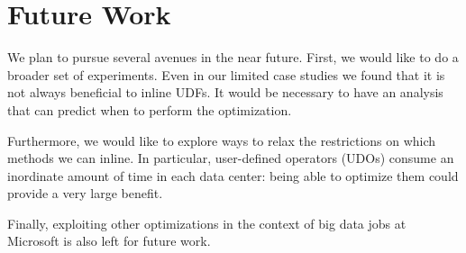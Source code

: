 \section{Future Work \label{sec:future}}

We plan to pursue several avenues in the near future.
First, we would like to do a broader set of experiments.
Even in our limited case studies we found that it is not always beneficial to
inline UDFs.
It would be necessary to have an analysis that can predict when to perform the optimization. 

Furthermore, we would like to explore ways to relax the restrictions on which methods we can inline.
In particular, user-defined operators (UDOs) consume an inordinate amount of time in each data center: being able to optimize them could provide a very large benefit.

Finally, exploiting other optimizations in the context of big data jobs at Microsoft is also left for future work.
